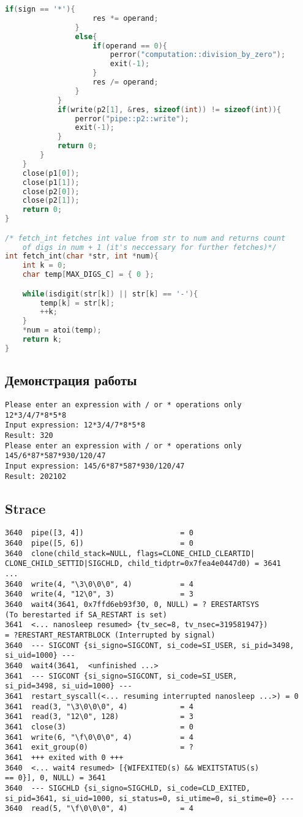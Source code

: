 \documentclass[12pt]{article}
\begin{document}
\begin{lstlisting}[language=C, basicstyle=\scriptsize]
	    		if(sign == '*'){
	    			res *= operand;
	    		}
	    		else{
	    			if(operand == 0){
	    				perror("computation::division_by_zero");
	    				exit(-1);
	    			}
	    			res /= operand;
	    		}
	    	}
	    	if(write(p2[1], &res, sizeof(int)) != sizeof(int)){
	    		perror("pipe::p2::write");
	    		exit(-1);
	    	}
	    	return 0;
	    }
	}
	close(p1[0]);
	close(p1[1]);
	close(p2[0]);
	close(p2[1]);
	return 0;
}

/* fetch_int fetches int value from str to num and returns count
    of digs in num + 1 (it's neccessary for further fetches)*/
int fetch_int(char *str, int *num){
	int k = 0;
	char temp[MAX_DIGS_C] = { 0 };

	while(isdigit(str[k]) || str[k] == '-'){
		temp[k] = str[k];
		++k;
	}
	*num = atoi(temp);
	return k;
}
\end{lstlisting}

\subsection*{Демонстрация работы}

\begin{lstlisting}[basicstyle=\scriptsize]
Please enter an expression with / or * operations only
12*3/4/7*8*5*8
Input expression: 12*3/4/7*8*5*8
Result: 320
Please enter an expression with / or * operations only
145/6*87*587*930/120/47
Input expression: 145/6*87*587*930/120/47
Result: 202102
\end{lstlisting}

\subsection*{Strace}
\begin{verbatim}
3640  pipe([3, 4])                      = 0
3640  pipe([5, 6])                      = 0
3640  clone(child_stack=NULL, flags=CLONE_CHILD_CLEARTID|
CLONE_CHILD_SETTID|SIGCHLD, child_tidptr=0x7fea4e0447d0) = 3641
...
3640  write(4, "\3\0\0\0", 4)           = 4
3640  write(4, "12\0", 3)               = 3
3640  wait4(3641, 0x7ffd6eb93f30, 0, NULL) = ? ERESTARTSYS
(To berestarted if SA_RESTART is set)
3641  <... nanosleep resumed> {tv_sec=8, tv_nsec=319581947}) 
= ?ERESTART_RESTARTBLOCK (Interrupted by signal)
3640  --- SIGCONT {si_signo=SIGCONT, si_code=SI_USER, si_pid=3498,
si_uid=1000} ---
3640  wait4(3641,  <unfinished ...>
3641  --- SIGCONT {si_signo=SIGCONT, si_code=SI_USER,
si_pid=3498, si_uid=1000} ---
3641  restart_syscall(<... resuming interrupted nanosleep ...>) = 0
3641  read(3, "\3\0\0\0", 4)            = 4
3641  read(3, "12\0", 128)              = 3
3641  close(3)                          = 0
3641  write(6, "\f\0\0\0", 4)           = 4
3641  exit_group(0)                     = ?
3641  +++ exited with 0 +++
3640  <... wait4 resumed> [{WIFEXITED(s) && WEXITSTATUS(s)
== 0}], 0, NULL) = 3641
3640  --- SIGCHLD {si_signo=SIGCHLD, si_code=CLD_EXITED,
si_pid=3641, si_uid=1000, si_status=0, si_utime=0, si_stime=0} ---
3640  read(5, "\f\0\0\0", 4)            = 4
\end{verbatim}
\end{document}
